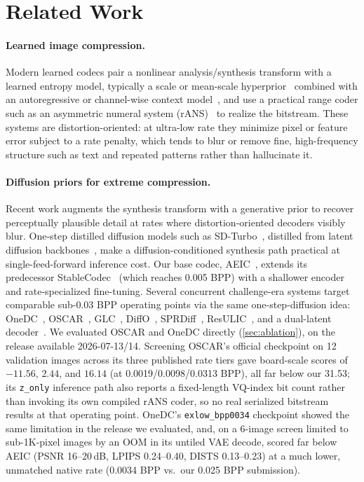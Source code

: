 \documentclass[runningheads]{llncs}
\begin{document}
\section{Related Work}
\label{sec:related}
\paragraph{Learned image compression.} Modern learned codecs pair a nonlinear analysis/synthesis transform with a learned entropy model, typically a scale or mean-scale hyperprior~\cite{balle2018hyperprior} combined with an autoregressive or channel-wise context model~\cite{he2022elic}, and use a practical range coder such as an asymmetric numeral system (rANS)~\cite{duda2009rans} to realize the bitstream. These systems are distortion-oriented: at ultra-low rate they minimize pixel or feature error subject to a rate penalty, which tends to blur or remove fine, high-frequency structure such as text and repeated patterns rather than hallucinate it.

\paragraph{Diffusion priors for extreme compression.} Recent work augments the synthesis transform with a generative prior to recover perceptually plausible detail at rates where distortion-oriented decoders visibly blur. One-step distilled diffusion models such as SD-Turbo~\cite{sauer2023sdturbo}, distilled from latent diffusion backbones~\cite{rombach2022ldm}, make a diffusion-conditioned synthesis path practical at single-feed-forward inference cost. Our base codec, AEIC~\cite{zhang2026aeic}, extends its predecessor StableCodec~\cite{zhang2025stablecodec} (which reaches 0.005 BPP) with a shallower encoder and rate-specialized fine-tuning. Several concurrent challenge-era systems target comparable sub-0.03 BPP operating points via the same one-step-diffusion idea: OneDC~\cite{xue2025onedc}, OSCAR~\cite{guo2025oscar}, GLC~\cite{qi2025glc}, DiffO~\cite{park2025diffo}, SPRDiff~\cite{wei2026sprdiff}, ResULIC~\cite{ke2025resulic}, and a dual-latent decoder~\cite{mao2026duallatent}. We evaluated OSCAR and OneDC directly (\cref{sec:ablation}), on the release available 2026-07-13/14. Screening OSCAR's official checkpoint on 12 validation images across its three published rate tiers gave board-scale scores of $-11.56$, $2.44$, and $16.14$ (at 0.0019/0.0098/0.0313 BPP), all far below our 31.53; its \texttt{z\_only} inference path also reports a fixed-length VQ-index bit count rather than invoking its own compiled rANS coder, so no real serialized bitstream results at that operating point. OneDC's \texttt{exlow\_bpp0034} checkpoint showed the same limitation in the release we evaluated, and, on a 6-image screen limited to sub-1K-pixel images by an OOM in its untiled VAE decode, scored far below AEIC (PSNR 16--20\,dB, LPIPS 0.24--0.40, DISTS 0.13--0.23) at a much lower, unmatched native rate (0.0034 BPP vs.\ our 0.025 BPP submission).
\end{document}
